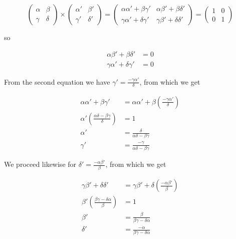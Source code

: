 \begin{equation}
    \begin{pmatrix}
        \alpha & \beta  \\
        \gamma & \delta
    \end{pmatrix} \times
    \begin{pmatrix}
        \alpha' & \beta'  \\
        \gamma' & \delta'
    \end{pmatrix} =
    \begin{pmatrix}
        \alpha\alpha' + \beta\gamma'  & \alpha\beta' + \beta\delta'  \\
        \gamma\alpha' + \delta\gamma' & \gamma\beta' + \delta\delta'
    \end{pmatrix} =
    \begin{pmatrix}
        1 & 0 \\
        0 & 1
    \end{pmatrix}
\end{equation}

so

\begin{align}
    \alpha\beta' + \beta\delta'   & = 0 \\
    \gamma\alpha' + \delta\gamma' & = 0
\end{align}

From the second equation we have $\gamma' = \frac{-\gamma\alpha'}{\delta}$, from which we get

\begin{align}
    \alpha\alpha' + \beta\gamma'                        & = \alpha\alpha' + \beta (\frac{-\gamma\alpha'}{\delta}) \\
    \alpha' (\frac{\alpha\delta - \beta\gamma}{\delta}) & = 1                                                     \\
    \alpha'                                             & = \frac{\delta}{\alpha\delta - \beta\gamma}             \\
    \gamma'                                             & = \frac{-\gamma}{\alpha\delta - \beta\gamma}
\end{align}

We proceed likewise for $\delta' = \frac{-\alpha\beta'}{\beta}$, from which we get

\begin{align}
    \gamma\beta' + \delta\delta'                      & = \gamma\beta' + \delta (\frac{-\alpha\beta'}{\beta}) \\
    \beta' (\frac{\beta\gamma - \delta\alpha}{\beta}) & = 1                                                   \\
    \beta'                                            & = \frac{\beta}{\beta\gamma - \delta\alpha}            \\
    \delta'                                           & = \frac{-\alpha}{\beta\gamma - \delta\alpha}
\end{align}

